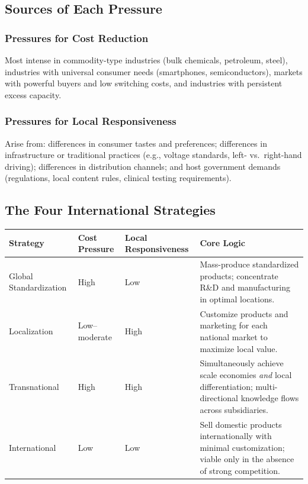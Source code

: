 \documentclass[11pt, letterpaper]{article}
\begin{document}
\subsection{Sources of Each Pressure}

\subsubsection{Pressures for Cost Reduction}
Most intense in commodity-type industries (bulk chemicals, petroleum, steel), industries with universal consumer needs (smartphones, semiconductors), markets with powerful buyers and low switching costs, and industries with persistent excess capacity.

\subsubsection{Pressures for Local Responsiveness}
Arise from: differences in consumer tastes and preferences; differences in infrastructure or traditional practices (e.g., voltage standards, left- vs.\ right-hand driving); differences in distribution channels; and host government demands (regulations, local content rules, clinical testing requirements).

\subsection{The Four International Strategies}

\begin{center}
\begin{tabular}{p{3.5cm} p{2.5cm} p{2.5cm} p{4.5cm}}
\toprule
\textbf{Strategy} & \textbf{Cost Pressure} & \textbf{Local Responsiveness} & \textbf{Core Logic} \\
\midrule
Global Standardization & High & Low & Mass-produce standardized products; concentrate R\&D and manufacturing in optimal locations. \\
\addlinespace
Localization & Low–moderate & High & Customize products and marketing for each national market to maximize local value. \\
\addlinespace
Transnational & High & High & Simultaneously achieve scale economies \textit{and} local differentiation; multi-directional knowledge flows across subsidiaries. \\
\addlinespace
International & Low & Low & Sell domestic products internationally with minimal customization; viable only in the absence of strong competition. \\
\bottomrule
\end{tabular}
\end{center}
\end{document}
